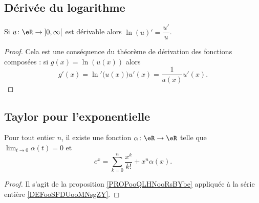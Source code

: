 	\subsection{Dérivée du logarithme}

	\begin{lemma}       \label{LEMooTGCBooJdkLpg}
		Si \( u\colon \eR\to \mathopen] 0 , \infty \mathclose[\) est dérivable alors \( \ln(u)'=\dfrac{ u' }{ u }\).
	\end{lemma}

	\begin{proof}
		Cela est une conséquence du théorème de dérivation des fonctions composées : si \( g(x)=\ln(u(x))\) alors
		\begin{equation}
			g'(x)=\ln'\big( u(x) \big)u'(x)=\frac{1}{ u(x) }u'(x).
		\end{equation}
	\end{proof}

	\subsection{Taylor pour l'exponentielle}

	\begin{proposition}       \label{PROPooQBRGooAhGrvP}
		Pour tout entier \( n\), il existe une fonction \( \alpha\colon \eR\to \eR\) telle que \( \lim_{t\to 0} \alpha(t)=0\) et
		\begin{equation}
			e^x=\sum_{k=0}^n\frac{ x^k }{ k! }+x^n\alpha(x).
		\end{equation}
	\end{proposition}

	\begin{proof}
		Il s'agit de la proposition \ref{PROPooQLHNooRsBYbe} appliquée à la série entière \eqref{DEFooSFDUooMNsgZY}.
	\end{proof}

